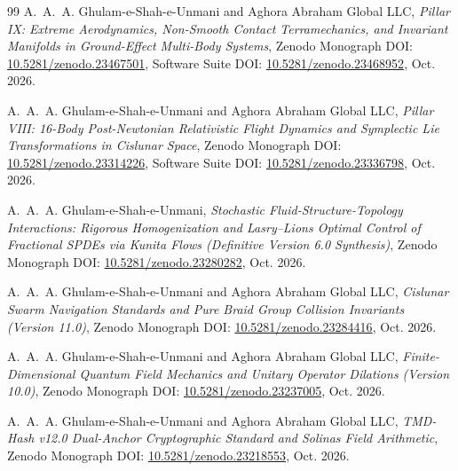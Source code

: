 \documentclass[11pt,a4paper,reqno]{article}
\theoremstyle{plain}
\theoremstyle{definition}
\theoremstyle{remark}
\numberwithin{equation}{section}
\begin{document}
\begin{thebibliography}{99}
A.~A.~A. Ghulam-e-Shah-e-Unmani and {Aghora Abraham Global LLC},
\emph{Pillar IX: Extreme Aerodynamics, Non-Smooth Contact Terramechanics, and Invariant Manifolds in Ground-Effect Multi-Body Systems},
Zenodo Monograph DOI: \href{https://doi.org/10.5281/zenodo.23467501}{10.5281/zenodo.23467501}, Software Suite DOI: \href{https://doi.org/10.5281/zenodo.23468952}{10.5281/zenodo.23468952}, Oct. 2026.

A.~A.~A. Ghulam-e-Shah-e-Unmani and {Aghora Abraham Global LLC},
\emph{Pillar VIII: 16-Body Post-Newtonian Relativistic Flight Dynamics and Symplectic Lie Transformations in Cislunar Space},
Zenodo Monograph DOI: \href{https://doi.org/10.5281/zenodo.23314226}{10.5281/zenodo.23314226}, Software Suite DOI: \href{https://doi.org/10.5281/zenodo.23336798}{10.5281/zenodo.23336798}, Oct. 2026.

A.~A.~A. Ghulam-e-Shah-e-Unmani,
\emph{Stochastic Fluid-Structure-Topology Interactions: Rigorous Homogenization and Lasry--Lions Optimal Control of Fractional SPDEs via Kunita Flows (Definitive Version 6.0 Synthesis)},
Zenodo Monograph DOI: \href{https://doi.org/10.5281/zenodo.23280282}{10.5281/zenodo.23280282}, Oct. 2026.

A.~A.~A. Ghulam-e-Shah-e-Unmani and {Aghora Abraham Global LLC},
\emph{Cislunar Swarm Navigation Standards and Pure Braid Group Collision Invariants (Version 11.0)},
Zenodo Monograph DOI: \href{https://doi.org/10.5281/zenodo.23284416}{10.5281/zenodo.23284416}, Oct. 2026.

A.~A.~A. Ghulam-e-Shah-e-Unmani and {Aghora Abraham Global LLC},
\emph{Finite-Dimensional Quantum Field Mechanics and Unitary Operator Dilations (Version 10.0)},
Zenodo Monograph DOI: \href{https://doi.org/10.5281/zenodo.23237005}{10.5281/zenodo.23237005}, Oct. 2026.

A.~A.~A. Ghulam-e-Shah-e-Unmani and {Aghora Abraham Global LLC},
\emph{TMD-Hash v12.0 Dual-Anchor Cryptographic Standard and Solinas Field Arithmetic},
Zenodo Monograph DOI: \href{https://doi.org/10.5281/zenodo.23218553}{10.5281/zenodo.23218553}, Oct. 2026.

\end{thebibliography}
\end{document}
